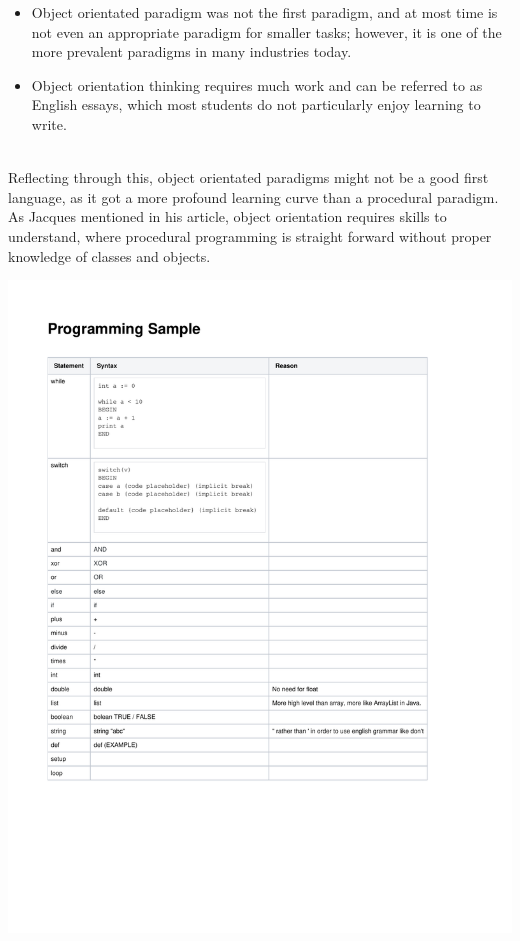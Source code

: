 \begin{itemize}
    \item Object orientated paradigm was not the first paradigm, and at most time is not even an appropriate paradigm for smaller tasks; however, it is one of the more prevalent paradigms in many industries today.   
    \item Object orientation thinking requires much work and can be referred to as English essays, which most students do not particularly enjoy learning to write.\cite{tutlisp}\cite{medlisp}
\end{itemize}\\
Reflecting through this, object orientated paradigms might not be a good first language, as it got a more profound learning curve than a procedural paradigm. As Jacques mentioned in his article, object orientation requires skills to understand, where procedural programming is straight forward without proper knowledge of classes and objects.


\includegraphics[scale=0.95]{sections/Analyze_phase/pdf/PL-ProgrammingSample-210219-1034-7.pdf}